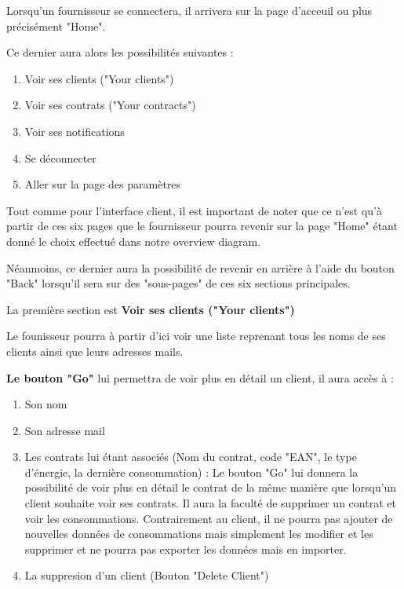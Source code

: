 Lorsqu'un fournisseur se connectera, il arrivera sur la page d'acceuil ou plus précisément "Home".
\begin{flushleft}
Ce dernier aura alors les possibilités suivantes :
\end{flushleft}
\begin{enumerate}
\item Voir ses clients ("Your clients")
\item Voir ses contrats ("Your contracts")
\item Voir ses notifications
\item Se déconnecter
\item Aller sur la page des paramètres
\end{enumerate}

\begin{flushleft}
Tout comme pour l'interface client, il est important de noter que ce n'est qu'à partir de ces six pages que le fournisseur pourra revenir sur la page "Home" étant donné le choix effectué dans notre overview diagram.
\end{flushleft}

\begin{flushleft}
Néanmoins, ce dernier aura la possibilité de revenir en arrière à l'aide du bouton "Back" lorsqu'il sera sur des "sous-pages" de ces six sections principales.
\end{flushleft}

\newpage

\begin{flushleft}
La première section est \textbf{Voir ses clients ("Your clients")}
\end{flushleft}

\begin{flushleft}
Le founisseur pourra à partir d'ici voir une liste reprenant tous les noms de ses clients ainsi que leurs adresses mails. 
\end{flushleft}

\begin{flushleft}
\textbf{Le bouton "Go"} lui permettra de voir plus en détail un client, il aura accès à :
\end{flushleft}
\begin{enumerate}
\item Son nom
\item Son adresse mail
\item Les contrats lui étant associés (Nom du contrat, code "EAN", le type d'énergie, la dernière consommation) : \newline
Le bouton "Go" lui donnera la possibilité de voir plus en détail le contrat de la même manière que lorsqu'un client souhaite voir ses contrats.\newline
Il aura la faculté de supprimer un contrat et voir les consommations.\newline
Contrairement au client, il ne pourra pas ajouter de nouvelles données de consommations mais simplement les modifier et les supprimer et ne pourra pas exporter les données mais en importer.
\item La suppresion d'un client (Bouton "Delete Client")
\end{enumerate}

